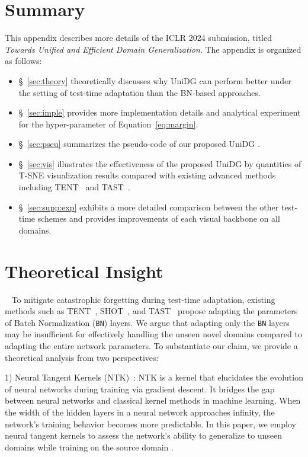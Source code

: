 \documentclass{article} \usepackage{iclr2024_conference,times}
\def\Model{UniDG }
\begin{document}
\section{Summary}
This appendix describes more details of the ICLR 2024 submission, titled \textit{Towards Unified and Efficient Domain Generalization}. The appendix is organized as follows:
\begin{itemize}
	\item \S~\ref{sec:theory} theoretically discusses why \Model can perform better under the setting of test-time adaptation than the BN-based approaches.
	\item \S~\ref{sec:imple} provides more implementation details and analytical experiment for the hyper-parameter  of Equation~\ref{eq:margin}.
	\item \S~\ref{sec:pseu} summarizes the pseudo-code of our proposed \Model.
	\item \S~\ref{sec:vis} illustrates the effectiveness of the proposed \Model by quantities of T-SNE visualization results compared with existing advanced methods including TENT~\cite{wang2020tent} and TAST~\cite{jang2022test}.
	\item \S~\ref{sec:supp:exp} exhibits a more detailed comparison between the other test-time schemes and provides improvements of each visual backbone on all domains.
	
\end{itemize}

\section{Theoretical Insight}~\label{sec:theory}
To mitigate catastrophic forgetting during test-time adaptation, existing methods such as TENT~\cite{wang2020tent}, SHOT~\cite{liang2020we}, and TAST~\cite{jang2022test} propose adapting the parameters of Batch Normalization (\texttt{BN}) layers. We argue that adapting only the \texttt{BN} layers may be insufficient for effectively handling the unseen novel domains compared to adapting the entire network parameters. To substantiate our claim, we provide a theoretical analysis from two perspectives:

1) Neural Tangent Kernels (NTK)~\cite{jacot2018neural}: NTK is a kernel that elucidates the evolution of neural networks during training via gradient descent. It bridges the gap between neural networks and classical kernel methods in machine learning. When the width of the hidden layers in a neural network approaches infinity, the network's training behavior becomes more predictable. In this paper, we employ neural tangent kernels to assess the network's ability to generalize to unseen domains  while training on the source domain .
\end{document}
